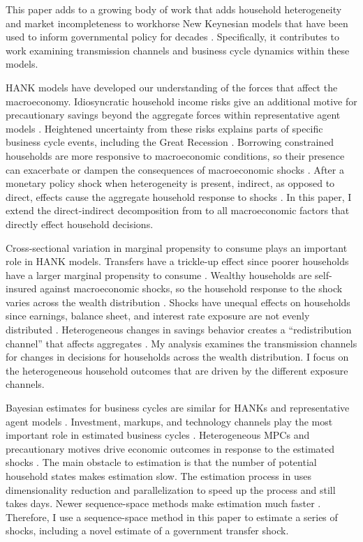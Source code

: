 This paper adds to a growing body of work that adds household heterogeneity and market incompleteness to workhorse New Keynesian models that have been used to inform governmental policy for decades \autocites{woodford2003interest}{smets2007shocks}. Specifically, it contributes to work examining transmission channels and business cycle dynamics within these models. 

HANK models have developed our understanding of the forces that affect the macroeconomy. Idiosyncratic household income risks give an additional motive for precautionary savings beyond the aggregate forces within representative agent models \autocites{mckay2016power}{auclert2020micro}{acharya2023optimal}. Heightened uncertainty from these risks explains parts of specific business cycle events, including the Great Recession \autocites{bayer2019precautionary}. Borrowing constrained households are more responsive to macroeconomic conditions, so their presence can exacerbate or dampen the consequences of macroeconomic shocks \autocites{bilbiie2020new}. After a monetary policy shock when heterogeneity is present, indirect, as opposed to direct, effects cause the aggregate household response to shocks \autocites{kaplan2018monetary}. In this paper, I extend the direct-indirect decomposition from \textcite{kaplan2018monetary} to all macroeconomic factors that directly effect household decisions. 

Cross-sectional variation in marginal propensity to consume plays an important role in HANK models. Transfers have a trickle-up effect since poorer households have a larger marginal propensity to consume \autocite{auclert2023trickling}. Wealthy households are self-insured against macroeconomic shocks, so the household response to the shock varies across the wealth distribution \autocite{gornemann2016doves}. Shocks have unequal effects on households since earnings, balance sheet, and interest rate exposure are not evenly distributed \autocite{auclert2019monetary}. Heterogeneous changes in savings behavior creates a ``redistribution channel'' that affects aggregates \autocite{auclert2019monetary}. My analysis examines the transmission channels for changes in decisions for households across the wealth distribution. I focus on the heterogeneous household outcomes that are driven by the different exposure channels.

Bayesian estimates for business cycles are similar for HANKs and representative agent models \autocites{smets2007shocks}{bayer2024shocks}. Investment, markups, and technology channels play the most important role in estimated business cycles \autocites{auclert2020micro}{bayer2024shocks}. Heterogeneous MPCs and precautionary motives drive economic outcomes in response to the estimated shocks \autocite{auclert2020micro}. The main obstacle to estimation is that the number of potential household states makes estimation slow. The estimation process in \textcite{bayer2024shocks} uses dimensionality reduction and parallelization to speed up the process and still takes days. Newer sequence-space methods make estimation much faster \autocite{auclert2021using}. Therefore, I use a sequence-space method in this paper to estimate a series of shocks, including a novel estimate of a government transfer shock.
